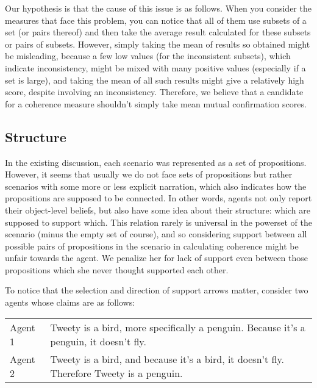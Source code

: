 \documentclass[10pt,]{scrartcl}
\begin{document}
Our hypothesis is that the cause of this issue is as follows. When you
consider the measures that face this problem, you can notice that all of
them use subsets of a set (or pairs thereof) and then take the average
result calculated for these subsets or pairs of subsets. However, simply
taking the mean of results so obtained might be misleading, because a
few low values (for the inconsistent subsets), which indicate
inconsistency, might be mixed with many positive values (especially if a
set is large), and taking the mean of all such results might give a
relatively high score, despite involving an inconsistency. Therefore, we
believe that a candidate for a coherence measure shouldn't simply take
mean mutual confirmation scores.

\subsection{Structure}

In the existing discussion, each scenario was represented as a set of
propositions. However, it seems that usually we do not face sets of
propositions but rather scenarios with some more or less explicit
narration, which also indicates how the propositions are supposed to be
connected. In other words, agents not only report their object-level
beliefs, but also have some idea about their structure: which are
supposed to support which. This relation rarely is universal in the
powerset of the scenario (minus the empty set of course), and so
considering support between all possible pairs of propositions in the
scenario in calculating coherence might be unfair towards the agent. We
penalize her for lack of support even between those propositions which
she never thought supported each other.

To notice that the selection and direction of support arrows matter,
consider two agents whose claims are as follows:

\vspace{2mm}

\begin{center}
\begin{tabular}{lp{9cm}}
\textsf{Agent 1}     & Tweety is a bird, more specifically a penguin. Because it’s a penguin, it doesn’t fly.  \\
\textsf{Agent 2}     &  Tweety is a bird, and because it’s a bird, it doesn't fly. Therefore Tweety is a penguin. \\
\end{tabular}
\end{center}
\end{document}
